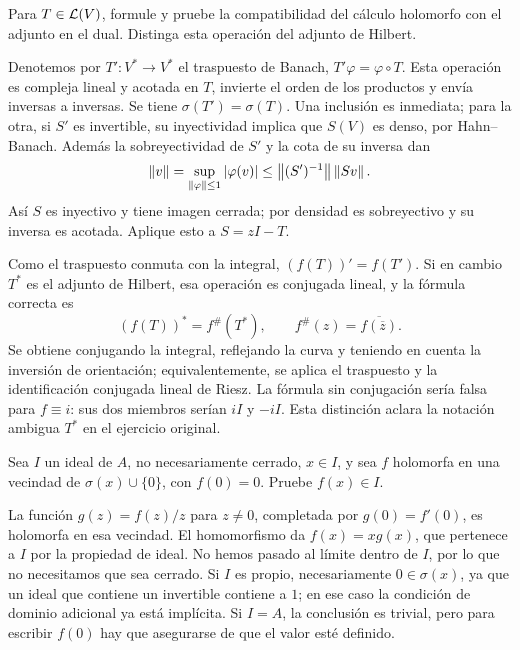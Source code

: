 \begin{ejercicio}\label{ej:v3-l23-6}
Para $T\in\mathcal L(V)$, formule y pruebe la compatibilidad del cálculo holomorfo con el adjunto en el dual. Distinga esta operación del adjunto de Hilbert.
\end{ejercicio}
\begin{solucion}
Denotemos por $T':V^*\to V^*$ el traspuesto de Banach, $T'\varphi=\varphi\circ T$. Esta operación es compleja lineal y acotada en $T$, invierte el orden de los productos y envía inversas a inversas. Se tiene $\sigma(T')=\sigma(T)$. Una inclusión es inmediata; para la otra, si $S'$ es invertible, su inyectividad implica que $S(V)$ es denso, por Hahn--Banach. Además la sobreyectividad de $S'$ y la cota de su inversa dan
\[
 \left\lVert v\right\rVert=\sup_{\left\lVert\varphi\right\rVert\le1}|\varphi(v)|
 \le\left\lVert(S')^{-1}\right\rVert\left\lVert Sv\right\rVert.
\]
Así $S$ es inyectivo y tiene imagen cerrada; por densidad es sobreyectivo y su inversa es acotada. Aplique esto a $S=zI-T$.

Como el traspuesto conmuta con la integral, $(f(T))'=f(T')$. Si en cambio $T^*$ es el adjunto de Hilbert, esa operación es conjugada lineal, y la fórmula correcta es
\[
 (f(T))^*=f^\#(T^*),\qquad f^\#(z)=\overline{f(\overline z)}.
\]
Se obtiene conjugando la integral, reflejando la curva y teniendo en cuenta la inversión de orientación; equivalentemente, se aplica el traspuesto y la identificación conjugada lineal de Riesz. La fórmula sin conjugación sería falsa para $f\equiv i$: sus dos miembros serían $iI$ y $-iI$. Esta distinción aclara la notación ambigua $T^*$ en el ejercicio original.
\end{solucion}

\begin{ejercicio}\label{ej:v3-l23-7}
Sea $I$ un ideal de $A$, no necesariamente cerrado, $x\in I$, y sea $f$ holomorfa en una vecindad de $\sigma(x)\cup\{0\}$, con $f(0)=0$. Pruebe $f(x)\in I$.
\end{ejercicio}
\begin{solucion}
La función $g(z)=f(z)/z$ para $z\ne0$, completada por $g(0)=f'(0)$, es holomorfa en esa vecindad. El homomorfismo da $f(x)=xg(x)$, que pertenece a $I$ por la propiedad de ideal. No hemos pasado al límite dentro de $I$, por lo que no necesitamos que sea cerrado. Si $I$ es propio, necesariamente $0\in\sigma(x)$, ya que un ideal que contiene un invertible contiene a $1$; en ese caso la condición de dominio adicional ya está implícita. Si $I=A$, la conclusión es trivial, pero para escribir $f(0)$ hay que asegurarse de que el valor esté definido.
\end{solucion}

